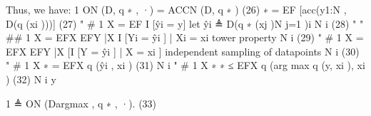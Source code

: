 \documentclass[10pt]{article}
\begin{document}
\begin{ReviewVerbatim}
Thus, we have:
  1
 ON (D, q ∗ , ·) = ACCN (D, q ∗ )                                                                                          (26)
                                        ∗
               = EF [acc(y1:N , D({q (xi )}))]                                                                             (27)
                    "                    #
                      1 X
               = EF          I [ŷi = y]                                                          let ŷi ≜ D({q ∗ (xj )}N
                                                                                                                         j=1 )i
                      N i
                                                                                                                           (28)
                         "             "                                       ##
                                           1 X
               = EF{X} EF{Y }|{X}              I [Yi = ŷi ] | {Xi } = {xi }                                 tower property
                                           N i
                                                                                                                           (29)
                         "                                          #
                             1 X
               = EF{X}           EFY |X [I [Y = ŷi ] | X = xi ]                        independent sampling of datapoints
                             N i
                                                                                                                           (30)
                         "                     #
                             1 X ∗
               = EF{X}           q (ŷi , xi )                                                                             (31)
                             N i
                         "                                  #
                             1 X ∗           ∗
               ≤ EF{X}           q (arg max q (y, xi ), xi )                                                               (32)
                             N i         y

                  1
               ≜ ON (Dargmax , q ∗ , ·).                                                                                   (33)
\end{ReviewVerbatim}
\end{document}
